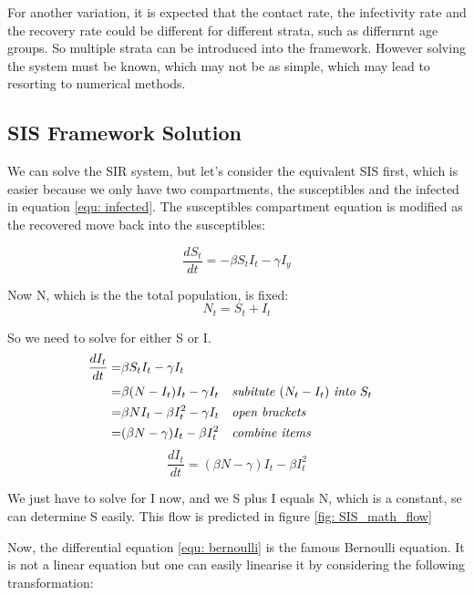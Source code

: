 \documentclass[fontsize=17pt]{article}
\begin{document}
For another variation, it is expected that the contact rate, the infectivity rate and the recovery rate could be different for different strata, such as differnrnt age groups. So multiple strata can be introduced into the framework. However solving the system must be known, which may not be as simple, which may lead to resorting to numerical methods.


\subsection{SIS Framework Solution}\label{sec: SIS_solution}
We can solve the SIR system, but let's consider the equivalent SIS first, which is easier because we only have two compartments, the susceptibles and the infected in equation \ref{equ: infected}. The susceptibles compartment equation is modified as the recovered move back into the susceptibles: 

\begin{equation}
\frac{dS_{t}}{dt}=-\beta S_{t}I_{t}-\gamma I_{y}
\end{equation}

Now N, which is the the total population, is fixed:
\begin{equation}
N_{t}=S_{t}+I_{t}
\end{equation}

So we need to solve for either S or I.
 \begin{align*}
\frac{dI_{t}}{dt}=&\beta S_{t}I_{t}-\gamma I_{t} \\
=&\beta (N-I_{t})I_{t}-\gamma I_{t} && \text{\textit{subitute} }(N_{t}-I_{t})\text{ \textit{into} }S_{t}\\
=&\beta NI_{t}-\beta I_{t}^{2}-\gamma I_{t} && \text{\textit{open brackets}}\\
=&(\beta N-\gamma)I_{t}-\beta I_{t}^{2}&& \text{\textit{combine items}}
\end{align*}
 \begin{equation}\label{equ: bernoulli}
\frac{dI_{t}}{dt}=(\beta N-\gamma)I_{t}-\beta I_{t}^{2}
\end{equation}

We just have to solve for I now, and we S plus I equals N, which is a constant, se can determine S easily. This flow is predicted in figure \ref{fig: SIS_math_flow}

Now, the differential equation \ref{equ: bernoulli} is the famous Bernoulli equation. It is not a linear equation but one can easily linearise it by considering the following transformation:
\end{document}
